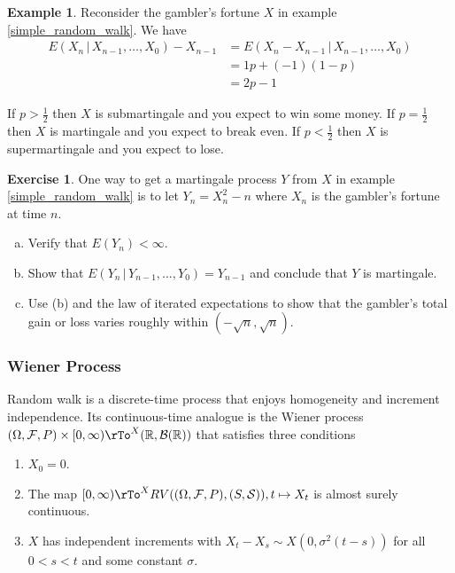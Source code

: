\documentclass[12pt]{amsart}
\theoremstyle{definition}
\newtheorem{example}[theorem]{Example}
\newtheorem{exercise}[theorem]{Exercise}
\begin{document}
\begin{example} Reconsider the gambler's fortune $X$ in example \ref{simple_random_walk}. We have
\begin{align*}
E(X_n \,|\, X_{n-1}, \dots , X_0) - X_{n-1} & = E(X_n - X_{n-1} \,|\, X_{n-1}, \dots , X_0) \\
 & = 1p + (-1)(1 - p) \\
 & = 2p - 1
\end{align*}

If $p > \frac{1}{2}$ then $X$ is submartingale and you expect to win some money. If $p = \frac{1}{2}$ then $X$ is martingale and you expect to break even. If $p < \frac{1}{2}$ then $X$ is supermartingale and you expect to lose.
\end{example}

\begin{exercise} One way to get a martingale process $Y$ from $X$ in example \ref{simple_random_walk} is to let $Y_n = X_n^2 - n$ where $X_n$ is the gambler's fortune at time $n$.
\begin{enumerate}[a.]
\item Verify that $E(Y_n) < \infty$.
\item Show that $E(Y_n \,|\, Y_{n-1}, \dots , Y_0) = Y_{n-1}$ and conclude that $Y$ is martingale.
\item Use (b) and the law of iterated expectations to show that the gambler's total gain or loss varies roughly within $(-\sqrt{n}, \sqrt{n})$.
\end{enumerate}
\end{exercise}

\subsubsection{Wiener Process} Random walk is a discrete-time process that enjoys homogeneity and increment independence. Its continuous-time analogue is the Wiener process $(\Omega, \mathcal{F}, P) \times [0, \infty) \rTo^X (\mathbb{R}, \mathcal{B}(\mathbb{R}))$ that satisfies three conditions
\begin{enumerate}[1.]
\item $X_0 = 0$.
\item The map $[0, \infty) \rTo^X RV((\Omega, \mathcal{F}, P),(S, \mathcal{S})), t \mapsto X_t$ is almost surely continuous.
\item $X$ has independent increments with $X_t - X_s \sim X(0,\sigma^2(t - s))$ for all $0 < s < t$ and some constant $\sigma$.
\end{enumerate}
\end{document}
